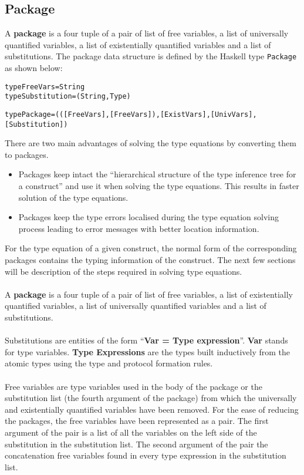 \documentclass[11pt]{article}
\begin{document}
\subsection {Package}
A {\bf package} is a four tuple of a pair of list of free variables, a list of universally quantified variables, a list of existentially quantified variables and a list of substitutions. The package data structure is defined by the Haskell type \texttt{Package} as shown below:
\begin{alltt}
  type FreeVars = String
  type Substitution = (String,Type)

  type Package = \bigg(\Big([FreeVars],[FreeVars]\Big),[ExistVars],[UnivVars],[Substitution]\bigg)
\end{alltt}


 There are two main advantages of solving the type equations by converting them to packages.
\begin{itemize} 
      \item Packages keep intact the ``hierarchical structure of the type inference tree for a construct'' and use it when solving the type equations. This results in faster solution of the type equations. 
      \item Packages keep the type errors localised during the type equation solving process leading to error messages with better location information.
  \end{itemize}  
For the type equation of a given construct, the normal form of the corresponding packages contains the typing information of the construct.
The next few sections will be description of the steps required in solving type equations.
~~\\~~\\
A {\bf package} is a four tuple of a pair of list of free variables, a list of existentially quantified variables, a list of universally quantified variables and a list of substitutions.
~~\\~~\\
 Substitutions are entities of the form ``{\bf Var = Type expression}''. {\bf Var} stands for type variables. {\bf Type Expressions} are the types built inductively from the atomic types using the type and protocol formation rules.
~~\\~~\\
Free variables are type variables used in the body of the package or the substitution list (the fourth argument of the package) from which the universally and existentially quantified variables have been removed. For the ease of reducing the packages, the free variables have been represented as a pair. The first argument of the pair is a list of all the variables on the left side of the substitution in the substitution list. The second argument of the pair the concatenation free variables found in every type expression in the substitution list.
\end{document}
